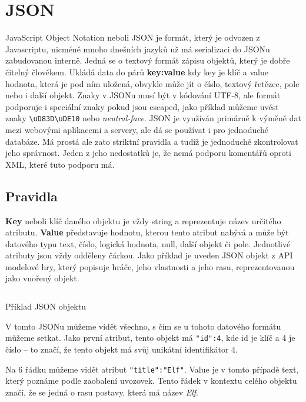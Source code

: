 \section{JSON}
JavaScript Object Notation neboli JSON je formát, který je odvozen z Javascriptu, nicméně mnoho dnešních jazyků už má serializaci do JSONu zabudovanou interně. Jedná se o textový formát zápisu objektů, který je dobře čitelný člověkem. Ukládá data do párů \textbf{key:value} kdy key je klíč a value hodnota, která je pod ním uložená, obvykle může jít o číslo, textový řetězec, pole nebo i další objekt. Znaky v JSONu musí být v kódování UTF-8, ale formát podporuje i speciální znaky pokud jsou escaped, jako příklad můžeme uvést znaky \verb |\uD83D\uDE10| nebo \textit{neutral-face}. JSON je využíván primárně k výměně dat mezi webovými aplikacemi a servery, ale dá se používat i pro jednoduché databáze. Má prostá ale zato striktní pravidla a tudíž je jednoduché zkontrolovat jeho správnost. Jeden z jeho nedostatků je, že nemá podporu komentářů oproti XML, které tuto podporu má. %


\subsection{Pravidla}
\textbf{Key} neboli klíč daného objektu je vždy string a reprezentuje název určitého atributu. \textbf{Value} představuje hodnotu, kterou tento atribut nabývá a může být datového typu text, číslo, logická hodnota, null, další objekt či pole. Jednotlivé atributy jsou vždy odděleny čárkou. Jako příklad je uveden JSON objekt z API modelové hry, který popisuje hráče, jeho vlastnosti a jeho rasu, reprezentovanou jako vnořený objekt.

\begin{listing}[H]
    \inputminted{json}{resources/code/standards/player.json}
    \caption{Příklad JSON objektu}
    \label{code:json_player}
\end{listing}

V tomto JSONu můžeme vidět všechno, s čím se u tohoto datového formátu můžeme setkat. Jako první atribut, tento objekt má \verb|"id":4|, kde id je klíč a 4 je číslo -- to značí, že tento objekt má svůj unikátní identifikátor 4.

Na 6 řádku můžeme vidět atribut \verb|"title":"Elf"|. Value je v tomto případě text, který poznáme podle zaobalení uvozovek. Tento řádek v kontextu celého objektu značí, že se jedná o rasu postavy, která má název \textit{Elf}.

